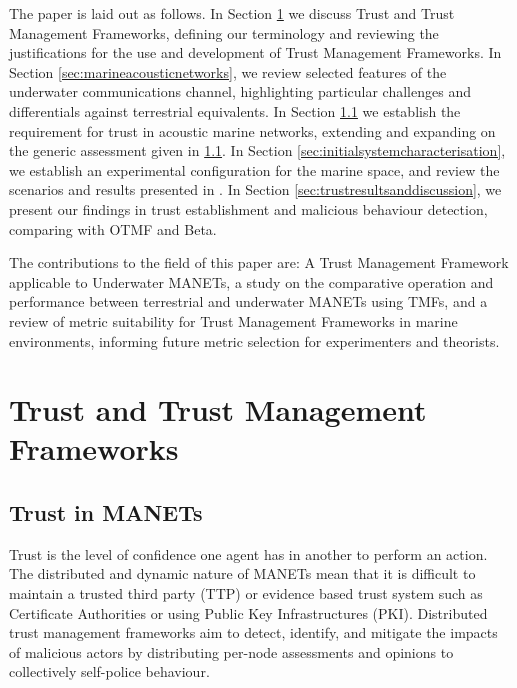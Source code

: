\documentclass[runningheads,a4paper]{llncs}
\begin{document}
The paper is laid out as follows.
In Section \ref{sec:trustandtmfs} we discuss Trust and Trust Management Frameworks, defining our terminology and reviewing the justifications for the use and development of Trust Management Frameworks.
In Section \ref{sec:marineacousticnetworks}, we review selected features of the underwater communications channel, highlighting particular challenges and differentials against terrestrial equivalents.
In Section \ref{sec:trustinmanets} we establish the requirement for trust in acoustic marine networks, extending and expanding on the generic assessment given in \ref{sec:trustinmanets}. 
In Section \ref{sec:initialsystemcharacterisation}, we establish an experimental configuration for the marine space, and review the scenarios and results presented in \cite{Guo11}.
In Section \ref{sec:trustresultsanddiscussion}, we present our findings in trust establishment and malicious behaviour detection, comparing with OTMF and Beta.

The contributions to the field of this paper are: A Trust Management Framework applicable to Underwater MANETs, a study on the comparative operation and performance between terrestrial and underwater MANETs using TMFs, and a review of metric suitability for Trust Management Frameworks in marine environments, informing future metric selection for experimenters and theorists.

\section{Trust and Trust Management Frameworks}\label{sec:trustandtmfs}

\subsection{Trust in MANETs}\label{sec:trustinmanets}

Trust is the level of confidence one agent has in another to perform an action. 
The distributed and dynamic nature of MANETs mean that it is difficult to maintain a trusted third party (TTP) or evidence based trust system such as Certificate Authorities or using Public Key Infrastructures (PKI).
Distributed trust management frameworks aim to detect, identify, and mitigate the impacts of malicious actors by distributing per-node assessments and opinions to collectively self-police behaviour.
\end{document}
